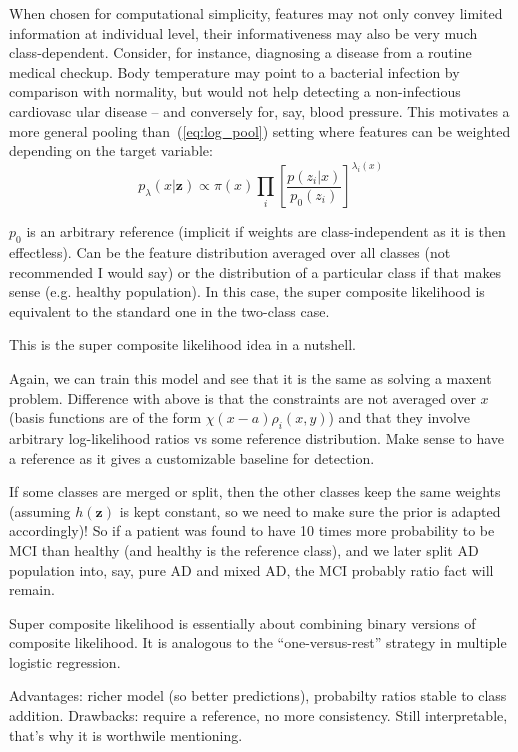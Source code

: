 \documentclass[english]{scrartcl}
\def\y{{\mathbf{y}}}
\def\y{{\mathbf{z}}}
\begin{document}
When chosen for computational simplicity, features may not only convey limited information at individual level, their informativeness may also be very much class-dependent. Consider, for instance, diagnosing a disease from a routine medical checkup. Body temperature may point to a bacterial infection by comparison with normality, but would not help detecting a non-infectious cardiovasc ular disease -- and conversely for, say, blood pressure. This motivates a more general pooling than~(\ref{eq:log_pool}) setting where features can be weighted depending on the target variable:
$$
p_\lambda(x|\y) \propto \pi(x) \prod_i \left[\frac{p(z_i|x)}{p_0(z_i)}\right]^{\lambda_i(x)}
$$

$p_0$ is an arbitrary reference (implicit if weights are class-independent as it is then effectless). Can be the feature distribution averaged over all classes (not recommended I would say) or the distribution of a particular class if that makes sense (e.g. healthy population). In this case, the super composite likelihood is equivalent to the standard one in the two-class case.

This is the super composite likelihood idea in a nutshell.

Again, we can train this model and see that it is the same as solving a maxent problem. Difference with above is that the constraints are not averaged over $x$ (basis functions are of the form $\chi(x-a)\rho_i(x,y)$) and that they involve arbitrary log-likelihood ratios vs some reference distribution. Make sense to have a reference as it gives a customizable baseline for detection.

If some classes are merged or split, then the other classes keep the same weights (assuming $h(\y)$ is kept constant, so we need to make sure the prior is adapted accordingly)! So if a patient was found to have 10 times more probability to be MCI than healthy (and healthy is the reference class), and we later split AD population into, say, pure AD and mixed AD, the MCI probably ratio fact will remain.

Super composite likelihood is essentially about combining binary versions of composite likelihood. It is analogous to the ``one-versus-rest'' strategy in multiple logistic regression. 


Advantages: richer model (so better predictions), probabilty ratios stable to class addition. Drawbacks: require a reference, no more consistency. Still interpretable, that's why it is worthwile mentioning.
\end{document}
